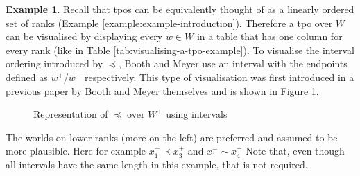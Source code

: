 \documentclass[english, 12pt]{scrartcl}
\theoremstyle{definition}
\newtheorem{example}{Example}
\theoremstyle{definition}
\theoremstyle{definition}
\begin{document}
\begin{example}
    \label{example:example-intervals}
    Recall that tpos can be equivalently thought of as a linearly ordered set of ranks (Example \ref{example:example-introduction}). Therefore a tpo over $W$ can be visualised by displaying every $w \in W$ in a table that has one column for every rank (like in Table \ref{tab:visualising-a-tpo-example}). To visualise the interval ordering introduced by $\preceq$, Booth and Meyer use an interval with the endpoints defined as $w^{+}$/$w^{-}$ respectively. This type of visualisation was first introduced in a previous paper by Booth and Meyer themselves \cite{Booth2007} and is shown in Figure \ref{fig:example-visualisation-scatterplot}.
        
    \begin{figure}[H]
        \centering
        \caption{Representation of $\preceq$ over $W^{\pm}$ using intervals}
        \label{fig:example-visualisation-scatterplot}
    \end{figure}
    
   The worlds on lower ranks (more on the left) are preferred and assumed to be more plausible. Here for example $x_{1}^{+} \prec x_{3}^{+}$ and $x_{1}^{-} \sim x_{4}^{+}$ Note that, even though all intervals have the same length in this example, that is not required.
\end{example}
\end{document}
